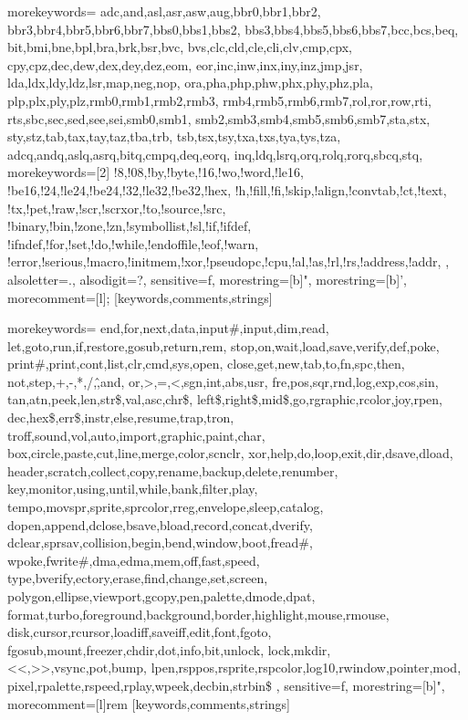%
  {morekeywords={%
    adc,and,asl,asr,asw,aug,bbr0,bbr1,bbr2,%
    bbr3,bbr4,bbr5,bbr6,bbr7,bbs0,bbs1,bbs2,%
    bbs3,bbs4,bbs5,bbs6,bbs7,bcc,bcs,beq,%
    bit,bmi,bne,bpl,bra,brk,bsr,bvc,%
    bvs,clc,cld,cle,cli,clv,cmp,cpx,%
    cpy,cpz,dec,dew,dex,dey,dez,eom,%
    eor,inc,inw,inx,iny,inz,jmp,jsr,%
    lda,ldx,ldy,ldz,lsr,map,neg,nop,%
    ora,pha,php,phw,phx,phy,phz,pla,%
    plp,plx,ply,plz,rmb0,rmb1,rmb2,rmb3,%
    rmb4,rmb5,rmb6,rmb7,rol,ror,row,rti,%
    rts,sbc,sec,sed,see,sei,smb0,smb1,%
    smb2,smb3,smb4,smb5,smb6,smb7,sta,stx,%
    sty,stz,tab,tax,tay,taz,tba,trb,%
    tsb,tsx,tsy,txa,txs,tya,tys,tza,%
    adcq,andq,aslq,asrq,bitq,cmpq,deq,eorq,%
    inq,ldq,lsrq,orq,rolq,rorq,sbcq,stq},%
  morekeywords=[2]{%
    !8,!08,!by,!byte,!16,!wo,!word,!le16,%
    !be16,!24,!le24,!be24,!32,!le32,!be32,!hex,%
    !h,!fill,!fi,!skip,!align,!convtab,!ct,!text,%
    !tx,!pet,!raw,!scr,!scrxor,!to,!source,!src,%
    !binary,!bin,!zone,!zn,!symbollist,!sl,!if,!ifdef,%
    !ifndef,!for,!set,!do,!while,!endoffile,!eof,!warn,%
    !error,!serious,!macro,!initmem,!xor,!pseudopc,!cpu,!al,!as,!rl,!rs,!address,!addr,
  },%
  alsoletter=.,%
  alsodigit=?,%
  sensitive=f,%
  morestring=[b]",%
  morestring=[b]',%
  morecomment=[l]{;}%
  }[keywords,comments,strings]

%
  {morekeywords={%
    end,for,next,data,input\#,input,dim,read,%
    let,goto,run,if,restore,gosub,return,rem,%
    stop,on,wait,load,save,verify,def,poke,%
    print\#,print,cont,list,clr,cmd,sys,open,%
    close,get,new,tab,to,fn,spc,then,%
    not,step,+,-,*,/,\^,and,%
    or,>,=,<,sgn,int,abs,usr,%
    fre,pos,sqr,rnd,log,exp,cos,sin,%
    tan,atn,peek,len,str\$,val,asc,chr\$,%
    left\$,right\$,mid\$,go,rgraphic,rcolor,joy,rpen,%
    dec,hex\$,err\$,instr,else,resume,trap,tron,%
    troff,sound,vol,auto,import,graphic,paint,char,%
    box,circle,paste,cut,line,merge,color,scnclr,%
    xor,help,do,loop,exit,dir,dsave,dload,%
    header,scratch,collect,copy,rename,backup,delete,renumber,%
    key,monitor,using,until,while,bank,filter,play,%
    tempo,movspr,sprite,sprcolor,rreg,envelope,sleep,catalog,%
    dopen,append,dclose,bsave,bload,record,concat,dverify,%
    dclear,sprsav,collision,begin,bend,window,boot,fread\#,%
    wpoke,fwrite\#,dma,edma,mem,off,fast,speed,%
    type,bverify,ectory,erase,find,change,set,screen,%
    polygon,ellipse,viewport,gcopy,pen,palette,dmode,dpat,%
    format,turbo,foreground,background,border,highlight,mouse,rmouse,%
    disk,cursor,rcursor,loadiff,saveiff,edit,font,fgoto,%
    fgosub,mount,freezer,chdir,dot,info,bit,unlock,%
    lock,mkdir,<<,>>,vsync,pot,bump,%
    lpen,rsppos,rsprite,rspcolor,log10,rwindow,pointer,mod,%
    pixel,rpalette,rspeed,rplay,wpeek,decbin,strbin\$%
  },%
  sensitive=f,%
  morestring=[b]",%
  morecomment=[l]{rem }%
  }[keywords,comments,strings]


